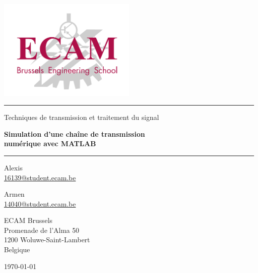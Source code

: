 \documentclass[10pt, oneside, a4paper]{article}
\begin{document}
\begin{titlepage}
    \centering
    \includegraphics[width=0.5\textwidth]{images/logo-ecam.png}\par
    \vspace{1cm}

    \rule{\linewidth}{1.5pt}%
    \vspace{5mm}
    {\rm\sffamily\LARGE Techniques de transmission et traitement du signal\par}
    \vspace{3mm}
    {\sffamily\bfseries\LARGE Simulation d’une chaîne de transmission\\
                              numérique avec MATLAB\textregistered{}\par}
    \vspace{5mm}
    \rule{\linewidth}{1.5pt}%
    \vspace{1cm}

    {\large%
        \begin{minipage}[t]{0.35\linewidth}
            \centering
            Alexis~ \\[1mm]
            \href{mailto:16139@student.ecam.be}{16139@student.ecam.be}
        \end{minipage}
        \begin{minipage}[t]{0.35\linewidth}
            \centering
            Armen~ \\[1mm]
            \href{mailto:14040@student.ecam.be}{14040@student.ecam.be}
        \end{minipage}
    \par}
    \vspace{1cm}

    {\large%
        ECAM Brussels             \\[1mm]
        Promenade de l'Alma 50    \\[1mm]
        1200 Woluwe-Saint-Lambert \\[1mm]
        Belgique
    \par}

    \vfill
    {\large\today\par}
\end{titlepage}
\end{document}
